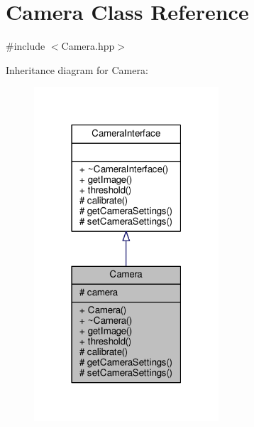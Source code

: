 \hypertarget{class_camera}{}\section{Camera Class Reference}
\label{class_camera}


{\ttfamily \#include $<$Camera.\+hpp$>$}



Inheritance diagram for Camera\+:\nopagebreak
\begin{figure}[H]
\begin{center}
\leavevmode
\includegraphics[width=195pt]{class_camera__inherit__graph}
\end{center}
\end{figure}


